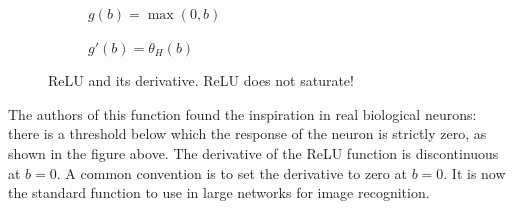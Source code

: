 \begin{figure}[h]  
	\centering 
	\begin{subfigure}[b]{0.4\linewidth}
		\caption{$ g(b)=\max(0,b) $}   
	\end{subfigure}
	\begin{subfigure}[b]{0.4\linewidth}
		\caption{$ g'(b)= \theta_H (b) $}  
	\end{subfigure}
	\vspace{10mm}
	\caption{ReLU and its derivative. ReLU does not saturate!}
\end{figure}

The authors of this function found the inspiration in real biological neurons: there is a threshold below which the response of the neuron is strictly zero, as shown in the figure above. The derivative of the ReLU function is discontinuous at $ b=0 $. A common convention is to set the derivative to zero at $ b=0 $. It is now the standard function to use in large networks for image recognition. \cite{mehlig}

\newpage


